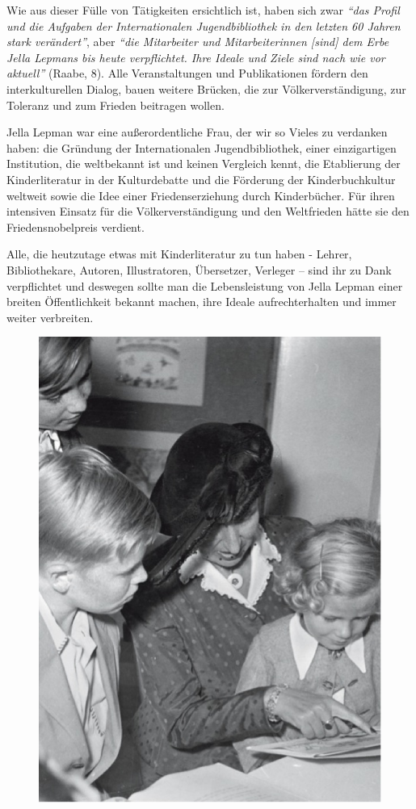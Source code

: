 \documentclass[a4paper,
fontsize=11pt,
oneside,
numbers=noperiodatend,
parskip=half-,
bibliography=totoc,
final
]{scrartcl}
\begin{document}
Wie aus dieser Fülle von Tätigkeiten ersichtlich ist, haben sich zwar
\emph{\enquote{das Profil und die Aufgaben der Internationalen
Jugendbibliothek in den letzten 60 Jahren stark verändert}}, aber
\emph{\enquote{die Mitarbeiter und Mitarbeiterinnen {[}sind{]} dem Erbe
Jella Lepmans bis heute verpflichtet. Ihre Ideale und Ziele sind nach
wie vor aktuell}} (Raabe, 8). Alle Veranstaltungen und Publikationen
fördern den interkulturellen Dialog, bauen weitere Brücken, die zur
Völkerverständigung, zur Toleranz und zum Frieden beitragen wollen.

Jella Lepman war eine außerordentliche Frau, der wir so Vieles zu
verdanken haben: die Gründung der Internationalen Jugendbibliothek,
einer einzigartigen Institution, die weltbekannt ist und keinen
Vergleich kennt, die Etablierung der Kinderliteratur in der
Kulturdebatte und die Förderung der Kinderbuchkultur weltweit sowie die
Idee einer Friedenserziehung durch Kinderbücher. Für ihren intensiven
Einsatz für die Völkerverständigung und den Weltfrieden hätte sie den
Friedensnobelpreis verdient.~

Alle, die heutzutage etwas mit Kinderliteratur zu tun haben - Lehrer,
Bibliothekare, Autoren, Illustratoren, Übersetzer, Verleger -- sind ihr
zu Dank verpflichtet und deswegen sollte man die Lebensleistung von
Jella Lepman einer breiten Öffentlichkeit bekannt machen, ihre Ideale
aufrechterhalten und immer weiter verbreiten.

\begin{figure}[htbp]
\centering
\includegraphics{img/bild30.jpg}
\end{figure}
\end{document}
